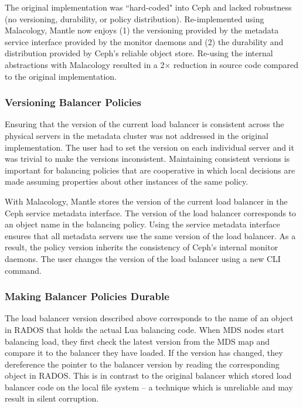 \documentclass[preprint]{sigplanconf-eurosys}
\begin{document}
The original implementation was ``hard-coded" into Ceph and lacked robustness
(no versioning, durability, or policy distribution).  Re-implemented using
Malacology, Mantle now enjoys (1) the versioning provided by the metadata
service interface provided by the monitor daemons and (2) the durability and
distribution provided by Ceph's reliable object store.  Re-using the internal
abstractions with Malacology resulted in a 2\(\times\) reduction in source code
compared to the original implementation.

\subsubsection{Versioning Balancer Policies}

Ensuring that the version of the current load balancer is consistent across the
physical servers in the metadata cluster was not addressed in the original
implementation. The user had to set the version on each individual server and
it was trivial to make the versions inconsistent. Maintaining consistent
versions is important for balancing policies that are cooperative in which local
decisions are made assuming properties about other instances of the same
policy.

With Malacology, Mantle stores the version of the current load balancer in the
Ceph service metadata interface. The version of the load balancer corresponds
to an object name in the balancing policy. Using the service metadata interface
ensures that all metadata servers use the same version of the load balancer. As
a result, the policy version inherits the consistency of Ceph's internal
monitor daemons. The user changes the version of the load balancer using a new
CLI command.

\subsubsection{Making Balancer Policies Durable}

The load balancer version described above corresponds to the name of an object
in RADOS that holds the actual Lua balancing code.  When MDS nodes start
balancing load, they first check the latest version from the MDS map and
compare it to the balancer they have loaded. If the version has changed, they
dereference the pointer to the balancer version by reading the corresponding
object in RADOS. This is in contrast to the original balancer which stored load
balancer code on the local file system -- a technique which is unreliable and
may result in silent corruption.
\end{document}
